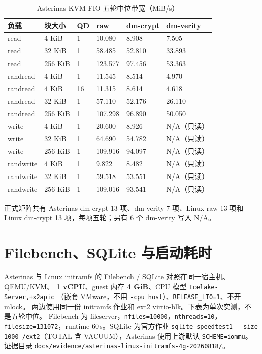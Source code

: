 \begin{table}[H]
    \centering
    \caption{Asterinas KVM FIO 五轮中位带宽（MiB/s）}
    \begin{tabular}{p{}p{}p{}p{}p{}p{}}
        \toprule
        \textbf{负载} & \textbf{块大小} & \textbf{QD} & \textbf{raw} & \textbf{dm-crypt} & \textbf{dm-verity} \\
        \midrule
        read & 4 KiB & 1 & 10.080 & 8.908 & 7.505 \\
        read & 32 KiB & 1 & 58.485 & 52.810 & 33.893 \\
        read & 256 KiB & 1 & 123.577 & 97.456 & 53.363 \\
        randread & 4 KiB & 1 & 11.545 & 8.514 & 4.970 \\
        randread & 4 KiB & 16 & 11.315 & 8.614 & 4.618 \\
        randread & 32 KiB & 1 & 57.110 & 52.176 & 26.110 \\
        randread & 256 KiB & 1 & 107.298 & 96.890 & 50.050 \\
        write & 4 KiB & 1 & 20.600 & 8.926 & N/A（只读） \\
        write & 32 KiB & 1 & 64.690 & 54.782 & N/A（只读） \\
        write & 256 KiB & 1 & 109.916 & 94.097 & N/A（只读） \\
        randwrite & 4 KiB & 1 & 9.822 & 8.482 & N/A（只读） \\
        randwrite & 32 KiB & 1 & 59.518 & 53.551 & N/A（只读） \\
        randwrite & 256 KiB & 1 & 109.016 & 93.541 & N/A（只读） \\
        \bottomrule
    \end{tabular}
\end{table}

正式矩阵共有 Asterinas dm-crypt 13 项、dm-verity 7 项、Linux raw 13 项和 Linux
dm-crypt 13 项，每项五轮；另有 6 个 dm-verity 写入 N/A。

\section{Filebench、SQLite 与启动耗时}

Asterinas 与 Linux initramfs 的 Filebench / SQLite 对照在同一宿主机、QEMU/KVM、
\textbf{1 vCPU}、guest 内存 \textbf{4 GiB}、CPU 模型 \texttt{Icelake-Server,+x2apic}
（嵌套 VMware，不用 \texttt{-cpu host}）、\texttt{RELEASE\_LTO=1}、不开 mlock。
两边使用同一份 initramfs 作业和 ext2 virtio-blk。下表为单次实测，不是五轮中位。
Filebench 为 fileserver，\texttt{nfiles=10000}，\texttt{nthreads=10}，
\texttt{filesize=131072}，runtime 60\,s。SQLite 为官方作业
\verb|sqlite-speedtest1 --size 1000 /ext2|（TOTAL 含 VACUUM），Asterinas
使用上游默认 \texttt{SCHEME=iommu}。证据目录
\texttt{docs/evidence/asterinas-linux-initramfs-4g-20260818/}。

